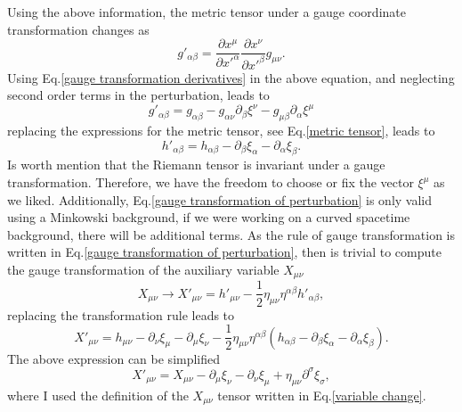 \documentclass{article}
\begin{document}
Using the above information, the metric tensor under a gauge coordinate transformation
changes as 
\begin{equation}
    g'_{\alpha\beta} = \frac{\partial x^{\mu}}{\partial x'^{\alpha}}
    \frac{\partial x^{\nu}}{\partial x'^{\beta}}g_{\mu\nu}.
\end{equation}
Using Eq.\eqref{gauge transformation derivatives} in the above equation, and neglecting
second order terms in the perturbation, leads to
\begin{equation}
    g'_{\alpha\beta} = g_{\alpha\beta} - g_{\alpha\nu}\partial_{\beta}\xi^{\nu}
    - g_{\mu\beta}\partial_{\alpha}\xi^{\mu}
\end{equation}
replacing the expressions for the metric tensor, see Eq.\eqref{metric tensor}, leads to
\begin{equation}
    \label{gauge transformation of perturbation}
    h'_{\alpha\beta} = h_{\alpha\beta} - \partial_{\beta}\xi_{\alpha} 
    - \partial_{\alpha}\xi_{\beta}.
\end{equation}
Is worth mention that the Riemann tensor is invariant under a gauge transformation. 
Therefore, we have the freedom to choose or fix the vector $\xi^{\mu}$ as we liked. 
Additionally, Eq.\eqref{gauge transformation of perturbation} is only valid using a 
Minkowski background, if we were working on a curved spacetime background, there will
be additional terms. As the rule of gauge transformation is written in 
Eq.\eqref{gauge transformation of perturbation}, then is trivial to compute the gauge
transformation of the auxiliary variable $X_{\mu\nu}$
\begin{equation}
    X_{\mu\nu} \to X'_{\mu\nu} = h'_{\mu\nu} 
    - \frac{1}{2}\eta_{\mu\nu}\eta^{\alpha\beta}h'_{\alpha\beta},
\end{equation}
replacing the transformation rule leads to
\begin{equation}
    X'_{\mu\nu} = h_{\mu\nu} - \partial_{\nu}\xi_{\mu} 
    - \partial_{\mu}\xi_{\nu}
    - \frac{1}{2}\eta_{\mu\nu}\eta^{\alpha\beta}\left(
    h_{\alpha\beta} - \partial_{\beta}\xi_{\alpha} - \partial_{\alpha}\xi_{\beta}\right).
\end{equation}
The above expression can be simplified 
\begin{equation}
    \label{gauge transformation X}
    X'_{\mu\nu} = X_{\mu\nu} - \partial_{\mu}\xi_{\nu} 
    - \partial_{\nu}\xi_{\mu} + \eta_{\mu\nu}\partial^{\sigma}\xi_{\sigma},
\end{equation}
where I used the definition of the $X_{\mu\nu}$ tensor written in Eq.\eqref{variable change}. 
\end{document}
